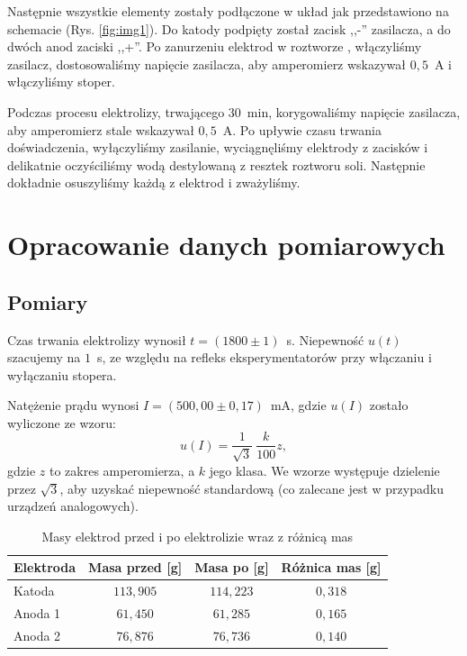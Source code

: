 \documentclass[12pt,a4paper]{article}
\numberwithin{equation}{section}
\begin{document}
Następnie wszystkie elementy zostały podłączone w układ jak przedstawiono na schemacie (Rys. \ref{fig:img1}). Do katody podpięty został zacisk ,,-'' zasilacza, a do dwóch anod zaciski ,,+''. Po zanurzeniu elektrod w roztworze , włączyliśmy zasilacz, dostosowaliśmy napięcie zasilacza, aby amperomierz wskazywał $0,5$~A i włączyliśmy stoper. 

Podczas procesu elektrolizy, trwającego $30$~min, korygowaliśmy napięcie zasilacza, aby amperomierz stale wskazywał $0,5$~A. Po upływie czasu trwania doświadczenia, wyłączyliśmy zasilanie, wyciągnęliśmy elektrody z zacisków i delikatnie oczyściliśmy wodą destylowaną z resztek roztworu soli. Następnie dokładnie osuszyliśmy każdą z elektrod i zważyliśmy.

\section{Opracowanie danych pomiarowych}
\subsection{Pomiary}

Czas trwania elektrolizy wynosił $t = (1800 \pm 1)$~s. Niepewność $u(t)$ szacujemy na $1$~s, ze względu na refleks eksperymentatorów przy włączaniu i wyłączaniu stopera.

Natężenie prądu wynosi $I = (500,00 \pm 0,17)$~mA, gdzie $u(I)$ zostało wyliczone ze wzoru:
\begin{equation}
	u(I) = \frac{1}{\sqrt{3}}~\frac{k}{100} z,
\end{equation}
gdzie $z$ to zakres amperomierza, a $k$ jego klasa. We wzorze występuje dzielenie przez $\sqrt{3}$, aby uzyskać niepewność standardową (co zalecane jest w przypadku urządzeń analogowych).
\pagebreak

\begin{table}[!ht]
	\caption{Masy elektrod przed i po elektrolizie wraz z różnicą mas}
	\centering
	\begin{tabular}{l|c|c|c}
		\hline Elektroda & Masa przed [g] & Masa po [g] & Różnica mas [g] \\ \hline \hline
		Katoda & $113,905$ & $114,223$ & $0,318$ \\
		Anoda 1 & $61,450$ & $61,285$ & $0,165$ \\
		Anoda 2 & $76,876$ & $76,736$ & $0,140$ \\ \hline
	\end{tabular}
	\label{tab:tab1}
\end{table}
\end{document}
